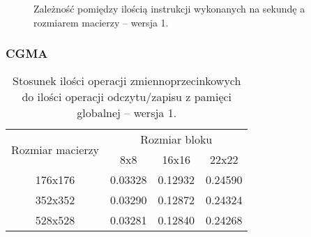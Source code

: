 \begin{figure}[H]
\centering
\caption{Zależność pomiędzy ilością instrukcji wykonanych na sekundę a rozmiarem macierzy -- wersja 1.}
\end{figure}

\subsubsection{CGMA}

\begin{table}[H]
\centering
\begin{tabular}{|c|c|c|c|}
\hline
\multirow{2}{*}{Rozmiar macierzy} & \multicolumn{3}{c|}{Rozmiar bloku} \\ \cline{2-4}
& 8x8 & 16x16 & 22x22 \\ \hline
176x176 & 0.03328 & 0.12932 & 0.24590 \\ \hline
352x352 & 0.03290 & 0.12872 & 0.24324 \\ \hline
528x528 & 0.03281 & 0.12840 & 0.24268 \\ \hline
\end{tabular}
\caption{Stosunek ilości operacji zmiennoprzecinkowych do ilości operacji odczytu/zapisu z pamięci globalnej -- wersja 1.}
\end{table}


